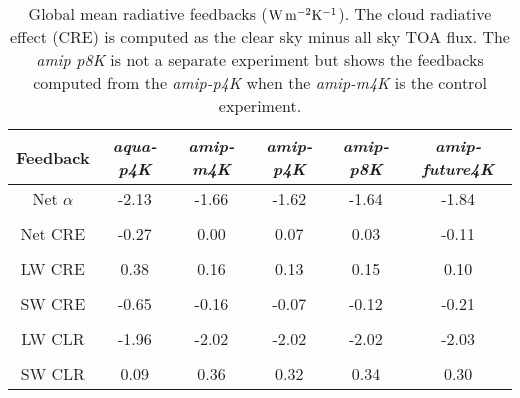 \documentclass[draft]{agujournal2019}
\begin{document}
%


\begin{table}
\begin{center}
\caption{Global mean radiative feedbacks ($\rm{W\, m^{-2} K^{-1}}$).  The cloud radiative effect (CRE) is computed as
 the clear sky minus all sky TOA flux.   The \textit{amip p8K} is not a separate experiment but
shows the feedbacks computed from the \textit{amip-p4K} when the \textit{amip-m4K} is the control experiment.}
    \begin{tabular}{*{6}{c}}
    \hline
    \hline
 Feedback & \textit{aqua-p4K} & \textit{amip-m4K} & \textit{amip-p4K} &  \textit{amip-p8K} & \textit{amip-future4K}   \\ \hline
    Net  $\alpha$        &   -2.13      &  -1.66          &  -1.62         & -1.64           & -1.84           \\ 
    \\
    Net CRE   & -0.27       &  0.00              & 0.07         & 0.03         & -0.11            \\  
    \\
    LW CRE   & 0.38        &  0.16              & 0.13           & 0.15        & 0.10             \\  
    \\
    SW CRE  & -0.65     &  -0.16              & -0.07          & -0.12        & -0.21            \\  
    \\
    LW CLR   & -1.96       &  -2.02            & -2.02           & -2.02       & -2.03            \\  
    \\
    SW CLR  & 0.09        & 0.36              & 0.32             & 0.34        & 0.30             \\  \hline

    \end{tabular}\par
    \label{tab:lambda_AGCM}
\end{center}
\end{table}
\end{document}
